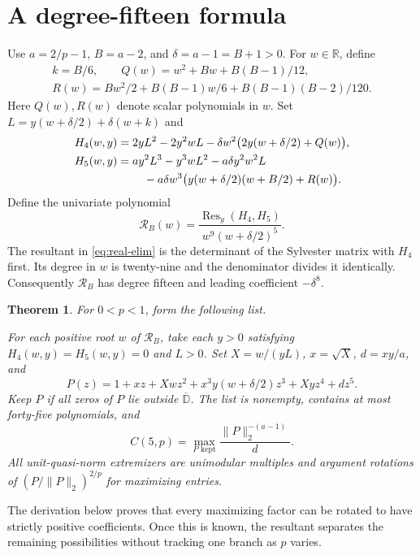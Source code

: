 \documentclass[11pt]{article}
\newtheorem{theorem}{Theorem}
\newcommand{\D}{\mathbb D}
\begin{document}
\section{A degree-fifteen formula}

Use \(a=2/p-1\), \(B=a-2\), and \(\delta=a-1=B+1>0\).
For \(w\in\mathbb R\), define
\[
 \begin{gathered} k=B/6,\qquad Q(w)=w^2+Bw+B(B-1)/12, \\
 R(w)=Bw^2/2+B(B-1)w/6+B(B-1)(B-2)/120.\end{gathered}
\]
Here \(Q(w),R(w)\) denote scalar polynomials in \(w\).
Set \(L=y(w+\delta/2)+\delta(w+k)\) and
\begin{align}
 H_4(w,y)={}&2yL^2-2y^2wL-\delta w^2\bigl(2y(w+\delta/2)+Q(w)\bigr),
       \label{eq:real4}\\
 H_5(w,y)={}&a y^2L^3-y^3wL^2-a\delta y^2w^2L \notag\\
     &\quad-a\delta w^3\bigl(y(w+\delta/2)(w+B/2)+R(w)\bigr).
       \label{eq:real5}
\end{align}
Define the univariate polynomial
\begin{equation}\label{eq:real-elim}
 \mathcal R_B(w)=\frac{\operatorname{Res}_y(H_4,H_5)}{w^9(w+\delta/2)^5}.
\end{equation}
The resultant in \eqref{eq:real-elim} is the determinant of the
Sylvester matrix with \(H_4\) first. Its degree in \(w\) is
twenty-nine and the denominator divides it identically.
Consequently \(\mathcal R_B\) has degree fifteen and leading
coefficient \(-\delta^8\).

\begin{theorem}\label{thm:main}
For \(0<p<1\), form the following list.

For each positive root \(w\) of \(\mathcal R_B\), take
each \(y>0\) satisfying \(H_4(w,y)=H_5(w,y)=0\) and
\(L>0\). Set \(X=w/(yL)\), \(x=\sqrt X\), \(d=xy/a\), and
\begin{equation}\label{eq:real-P}
 P(z)=1+xz+Xwz^2+x^3y(w+\delta/2)z^3+Xyz^4+dz^5.
\end{equation}
Keep \(P\) if all zeros of \(P\) lie outside \(\overline{\D}\).
The list is nonempty, contains at most forty-five polynomials, and
\[
 \boxed{\displaystyle C(5,p)=
     \max_{\text{\(P\) kept}}\frac{\|P\|_2^{-(a-1)}}{d}.}
\]
All unit-quasi-norm extremizers are unimodular multiples and
argument rotations of \((P/\|P\|_2)^{2/p}\) for maximizing entries.
\end{theorem}

The derivation below proves that every maximizing factor can be
rotated to have strictly positive coefficients. Once this is known, the
resultant separates the remaining possibilities without tracking
one branch as \(p\) varies.
\end{document}
